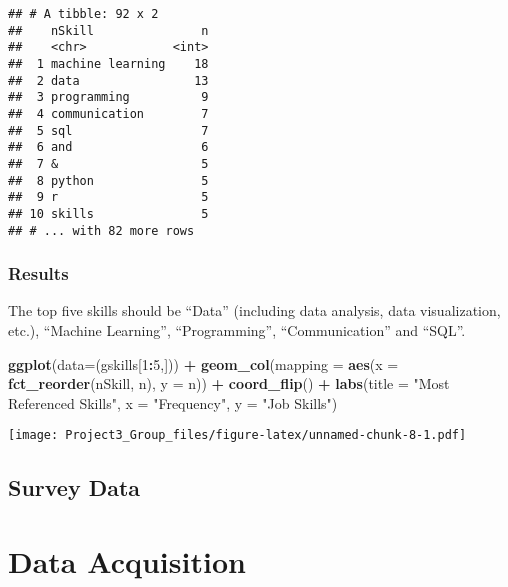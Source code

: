 \documentclass[]{article}
\newenvironment{Shaded}{\begin{snugshade}}{\end{snugshade}}
\newcommand{\DataTypeTok}[1]{\textcolor[rgb]{0.13,0.29,0.53}{#1}}
\newcommand{\DecValTok}[1]{\textcolor[rgb]{0.00,0.00,0.81}{#1}}
\newcommand{\KeywordTok}[1]{\textcolor[rgb]{0.13,0.29,0.53}{\textbf{#1}}}
\newcommand{\NormalTok}[1]{#1}
\newcommand{\OperatorTok}[1]{\textcolor[rgb]{0.81,0.36,0.00}{\textbf{#1}}}
\newcommand{\StringTok}[1]{\textcolor[rgb]{0.31,0.60,0.02}{#1}}
\begin{document}
\begin{verbatim}
## # A tibble: 92 x 2
##    nSkill               n
##    <chr>            <int>
##  1 machine learning    18
##  2 data                13
##  3 programming          9
##  4 communication        7
##  5 sql                  7
##  6 and                  6
##  7 &                    5
##  8 python               5
##  9 r                    5
## 10 skills               5
## # ... with 82 more rows
\end{verbatim}

\hypertarget{results}{%
\subsubsection{Results}\label{results}}

The top five skills should be ``Data'' (including data analysis, data
visualization, etc.), ``Machine Learning'', ``Programming'',
``Communication'' and ``SQL''.

\begin{Shaded}
\begin{Highlighting}[]
\KeywordTok{ggplot}\NormalTok{(}\DataTypeTok{data=}\NormalTok{(gskills[}\DecValTok{1}\OperatorTok{:}\DecValTok{5}\NormalTok{,])) }\OperatorTok{+}
\StringTok{  }\KeywordTok{geom_col}\NormalTok{(}\DataTypeTok{mapping =} \KeywordTok{aes}\NormalTok{(}\DataTypeTok{x =} \KeywordTok{fct_reorder}\NormalTok{(nSkill, n), }\DataTypeTok{y =}\NormalTok{ n)) }\OperatorTok{+}
\StringTok{  }\KeywordTok{coord_flip}\NormalTok{() }\OperatorTok{+}
\StringTok{  }\KeywordTok{labs}\NormalTok{(}\DataTypeTok{title =} \StringTok{"Most Referenced Skills"}\NormalTok{, }\DataTypeTok{x =} \StringTok{"Frequency"}\NormalTok{, }\DataTypeTok{y =} \StringTok{"Job Skills"}\NormalTok{)}
\end{Highlighting}
\end{Shaded}

\texttt{[image: Project3\_Group\_files/figure-latex/unnamed-chunk-8-1.pdf]}

\hypertarget{survey-data}{%
\subsection{Survey Data}\label{survey-data}}

\hypertarget{data-acquisition}{%
\section{Data Acquisition}\label{data-acquisition}}
\end{document}

